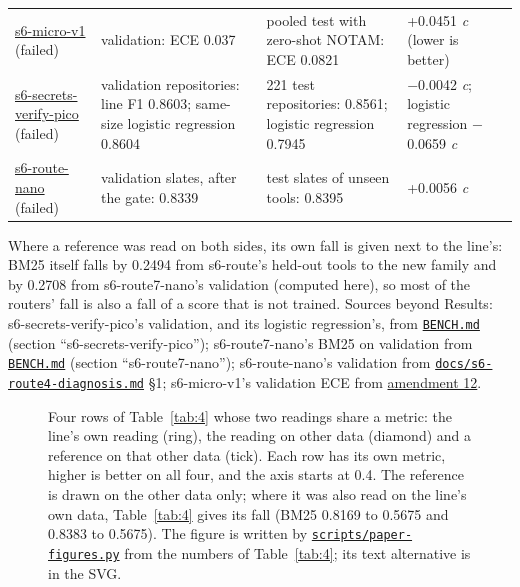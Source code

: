 \documentclass[10pt]{article}
\begin{document}
\begin{table}[htbp]
\begin{tabularx}{\linewidth}{@{}P{3.5cm}LLP{3.0cm}@{}}
\href{https://maxgfr.github.io/skycmd/results/\#s6-micro-v1-failed-on-calibration-only}{s6-micro-v1} (failed) & validation: ECE 0.037 & pooled test with zero-shot NOTAM: ECE 0.0821 & +0.0451 \emph{c} (lower is better) \\
\href{https://maxgfr.github.io/skycmd/results/\#s6-secrets-verify-pico-failed}{s6-secrets-verify-pico} (failed) & validation repositories: line F1 0.8603; same-size logistic regression 0.8604 & 221 test repositories: 0.8561; logistic regression 0.7945 & $-$0.0042 \emph{c}; logistic regression $-$0.0659 \emph{c} \\
\href{https://maxgfr.github.io/skycmd/results/\#s6-route-nano-failed}{s6-route-nano} (failed) & validation slates, after the gate: 0.8339 & test slates of unseen tools: 0.8395 & +0.0056 \emph{c} \\
\bottomrule
\end{tabularx}
\end{table}

Where a reference was read on both sides, its own fall is given next to the line's: BM25 itself falls by 0.2494 from s6-route's held-out tools to the new family and by 0.2708 from s6-route7-nano's validation (computed here), so most of the routers' fall is also a fall of a score that is not trained. Sources beyond Results: s6-secrets-verify-pico's validation, and its logistic regression's, from \href{https://github.com/maxgfr/skycmd/blob/main/BENCH.md}{\texttt{BENCH.md}} (section ``s6-secrets-verify-pico''); s6-route7-nano's BM25 on validation from \href{https://github.com/maxgfr/skycmd/blob/main/BENCH.md}{\texttt{BENCH.md}} (section ``s6-route7-nano''); s6-route-nano's validation from \href{https://github.com/maxgfr/skycmd/blob/main/docs/s6-route4-diagnosis.md}{\texttt{docs/\allowbreak{}s6-route4-diagnosis.md}} \S{}1; s6-micro-v1's validation ECE from \href{https://github.com/maxgfr/skycmd/blob/main/docs/s6-gen-prereg.md}{amendment 12}.

\begin{figure}[!t]
\centering
\scalebox{0.85}{}
\caption[Four rows of Table 4 whose two readings share a metric: the line's own reading (ring), the reading on other data (diamond) and a reference on that other data (tick).]{Four rows of Table~\ref{tab:4} whose two readings share a metric: the line's own reading (ring), the reading on other data (diamond) and a reference on that other data (tick). Each row has its own metric, higher is better on all four, and the axis starts at 0.4. The reference is drawn on the other data only; where it was also read on the line's own data, Table~\ref{tab:4} gives its fall (BM25 0.8169 to 0.5675 and 0.8383 to 0.5675). The figure is written by \href{https://github.com/maxgfr/skycmd/blob/main/scripts/paper-figures.py}{\texttt{scripts/\allowbreak{}paper-figures.py}} from the numbers of Table~\ref{tab:4}; its text alternative is in the SVG.}\label{fig:2}
\end{figure}
\end{document}

